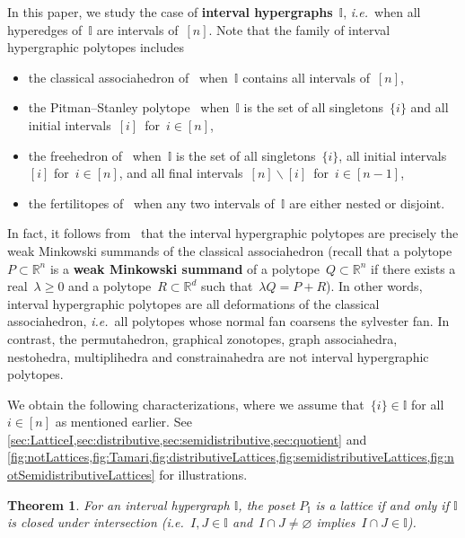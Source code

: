 \documentclass{amsart}
\newtheorem{theoremA}{Theorem}
\theoremstyle{definition}
\newcommand{\R}{\mathbb{R}} %
\newcommand{\ssm}{\smallsetminus} %
\newcommand{\ie}{\textit{i.e.}~} %
\newcommand{\defn}[1]{\textbf{\textsf{\color{PineGreen} #1}}} %
\newcommand{\II}{\mathbb I} %
\begin{document}
In this paper, we study the case of \defn{interval hypergraphs}~$\II$, \ie when all hyperedges of~$\II$ are intervals of~$[n]$.
Note that the family of interval hypergraphic polytopes includes
\begin{itemize}
\item the classical associahedron of~\cite{ShniderSternberg,Loday} when~$\II$ contains all intervals of~$[n]$,
\item the Pitman--Stanley polytope~\cite{PitmanStanley} when~$\II$ is the set of all singletons~$\{i\}$ and all initial intervals~$[i]$~for~${i \in [n]}$,
\item the freehedron of~\cite{Saneblidze-freehedron} when~$\II$ is the set of all singletons~$\{i\}$, all initial intervals~$[i]$ for~${i \in [n]}$, and all final intervals~$[n] \ssm [i]$~for~${i \in [n-1]}$,
\item the fertilitopes of~\cite{Defant-fertilitopes} when any two intervals of~$\II$ are either nested or disjoint.
\end{itemize}
In fact, it follows from~\cite{BazierMatteChapelierLaguetDouvilleMousavandThomasYildirim,PadrolPaluPilaudPlamondon} that the interval hypergraphic polytopes are precisely the weak Minkowski summands of the classical associahedron (recall that a polytope~$P \subset \R^n$ is a \defn{weak Minkowski summand} of a polytope~$Q \subset \R^n$ if there exists a real~$\lambda \ge 0$ and a polytope~$R \subset \R^d$ such that~$\lambda Q = P + R$).
In other words, interval hypergraphic polytopes are all deformations of the classical associahedron, \ie all polytopes whose normal fan coarsens the sylvester fan.
In contrast, the permutahedron, graphical zonotopes, graph associahedra, nestohedra, multiplihedra and constrainahedra are not interval hypergraphic polytopes.

We obtain the following characterizations, where we assume that~$\{i\} \in \II$ for all~$i \in [n]$ as mentioned earlier.
See \cref{sec:LatticeI,sec:distributive,sec:semidistributive,sec:quotient} and \cref{fig:notLattices,fig:Tamari,fig:distributiveLattices,fig:semidistributiveLattices,fig:notSemidistributiveLattices} for illustrations.

\begin{theoremA}
\label{thm:latticeI}
For an interval hypergraph $\II$, the poset $P_\II$ is a lattice if and only if $\II$ is closed under intersection (\ie $I, J \in \II$ and~$I \cap J \ne \varnothing$ implies~$I \cap J \in \II$).
\end{theoremA}
\end{document}

